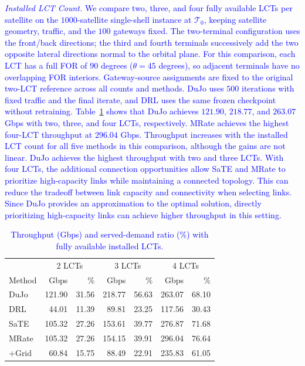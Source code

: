 \documentclass[journal]{IEEEtran}
\newcommand{\blue}[1]{\textcolor{blue}{#1}}
\begin{document}
\noindent\textit{\blue{Installed LCT Count.}} \blue{We compare two, three, and four fully available LCTs per satellite on the $1000$-satellite single-shell instance at $\mathcal{T}_0$, keeping satellite geometry, traffic, and the $100$ gateways fixed. The two-terminal configuration uses the front/back directions; the third and fourth terminals successively add the two opposite lateral directions normal to the orbital plane. For this comparison, each LCT has a full FOR of $90$ degrees ($\theta=45$ degrees), so adjacent terminals have no overlapping FOR interiors. Gateway-source assignments are fixed to the original two-LCT reference across all counts and methods. DuJo uses $500$ iterations with fixed traffic and the final iterate, and DRL uses the same frozen checkpoint without retraining. Table~\ref{tab:installed_lct_count} shows that DuJo achieves $121.90$, $218.77$, and $263.07$ Gbps with two, three, and four LCTs, respectively. MRate achieves the highest four-LCT throughput at $296.04$ Gbps. Throughput increases with the installed LCT count for all five methods in this comparison, although the gains are not linear. DuJo achieves the highest throughput with two and three LCTs. With four LCTs, the additional connection opportunities allow SaTE and MRate to prioritize high-capacity links while maintaining a connected topology. This can reduce the tradeoff between link capacity and connectivity when selecting links. Since DuJo provides an approximation to the optimal solution, directly prioritizing high-capacity links can achieve higher throughput in this setting.}

\begin{table}[t]
\centering
\caption{\blue{Throughput (Gbps) and served-demand ratio (\%) with fully available installed LCTs.}}
\label{tab:installed_lct_count}
\small
\setlength{\tabcolsep}{3pt}
{\color{blue}
\begin{tabular}{lrrrrrr}
\hline
 & \multicolumn{2}{c}{2 LCTs} & \multicolumn{2}{c}{3 LCTs} & \multicolumn{2}{c}{4 LCTs} \\
Method & Gbps & \% & Gbps & \% & Gbps & \% \\
\hline
DuJo & 121.90 & 31.56 & 218.77 & 56.63 & 263.07 & 68.10 \\
DRL & 44.01 & 11.39 & 89.81 & 23.25 & 117.56 & 30.43 \\
SaTE & 105.32 & 27.26 & 153.61 & 39.77 & 276.87 & 71.68 \\
MRate & 105.32 & 27.26 & 154.15 & 39.91 & 296.04 & 76.64 \\
+Grid & 60.84 & 15.75 & 88.49 & 22.91 & 235.83 & 61.05 \\
\hline
\end{tabular}
}
\end{table}



\end{document}
